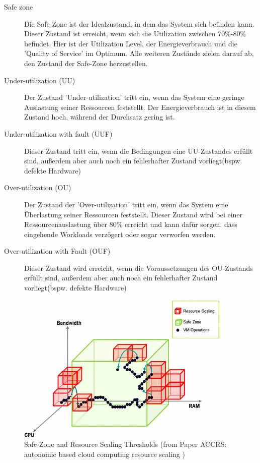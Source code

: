 \documentclass[a4paper,12pt]{scrartcl}
\begin{document}
\begin{description}
\item[Safe zone]
Die Safe-Zone ist der Idealzustand, in dem das System sich befinden kann. Dieser Zustand ist erreicht, wenn sich die Utilization zwischen 70\%-80\% befindet. Hier ist der Utilization Level, der Energieverbrauch und die 'Quality of Service' im Optimum.
Alle weiteren Zustände zielen darauf ab, den Zustand der Safe-Zone herzustellen.
\item[Under-utilization (UU)]
Der Zustand 'Under-utilization' tritt ein, wenn das System eine geringe Auslastung seiner Ressourcen feststellt. Der Energieverbrauch ist in diesem Zustand hoch, während der Durchsatz gering ist.
\item[Under-utilization with fault (UUF)]
Dieser Zustand tritt ein, wenn die Bedingungen eine UU-Zustandes erfüllt sind, außerdem aber auch noch ein fehlerhafter Zustand vorliegt(bspw. defekte Hardware)
\item[Over-utilization (OU)]
Der Zustand der 'Over-utilization' tritt ein, wenn das System eine Überlastung seiner Ressourcen feststellt. Dieser Zustand wird bei einer Ressourcenauslastung über 80\% erreicht und kann dafür sorgen, dass eingehende Workloads verzögert oder sogar verworfen werden.
\item[Over-utilization with Fault (OUF)]
Dieser Zustand wird erreicht, wenn die Voraussetzungen des OU-Zustands erfüllt sind, außerdem aber auch noch ein fehlerhafter Zustand vorliegt(bspw. defekte Hardware)
\end{description}

\begin{figure}[htbp]
  \centering
  \includegraphics[scale=1.2]{img/SDTScaling.png}
  \caption{Safe-Zone and Resource Scaling Thresholds (from Paper ACCRS: autonomic based cloud computing resource scaling )}
\end{figure}
\end{document}
